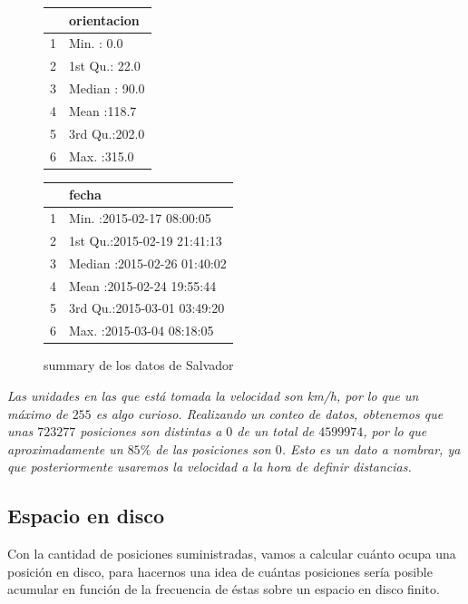 \documentclass[a4paper, 12pt]{article}
\begin{document}
\begin{figure}

\begin{center}
\begin{minipage}[t]{.3\textwidth}
	\begin{tabular}{rl}
  \hline
 &       orientacion \\ 
  \hline
1 & Min.   :  0.0   \\ 
  2 & 1st Qu.: 22.0   \\ 
  3 & Median : 90.0   \\ 
  4 & Mean   :118.7   \\ 
  5 & 3rd Qu.:202.0   \\ 
  6 & Max.   :315.0   \\ 
   \hline
\end{tabular}
\end{minipage}\hfil
\begin{minipage}[t]{.5\textwidth}
	\begin{tabular}{rl}
  \hline
 &       fecha \\ 
  \hline
1 & Min.   :2015-02-17 08:00:05   \\ 
  2 & 1st Qu.:2015-02-19 21:41:13   \\ 
  3 & Median :2015-02-26 01:40:02   \\ 
  4 & Mean   :2015-02-24 19:55:44   \\ 
  5 & 3rd Qu.:2015-03-01 03:49:20   \\ 
  6 & Max.   :2015-03-04 08:18:05   \\ 
   \hline
\end{tabular}
\end{minipage}
\end{center}
\caption{summary de los datos de Salvador}
\end{figure}

\textit{Las unidades en las que est\'a tomada la velocidad son km/h, por lo que un m\'aximo de $255$ es algo curioso. Realizando un conteo de datos, obtenemos que unas $723277$ posiciones son distintas a $0$ de un total de $4599974$, por lo que aproximadamente un $85\%$ de las posiciones son $0$. Esto es un dato a nombrar, ya que posteriormente usaremos la velocidad a la hora de definir distancias.}

\pagebreak
\subsection{Espacio en disco}

Con la cantidad de posiciones suministradas, vamos a calcular cu\'anto ocupa una posici\'on en disco, para hacernos una idea de cu\'antas posiciones ser\'ia posible acumular en funci\'on de la frecuencia de \'estas sobre un espacio en disco finito.\\
\end{document}
